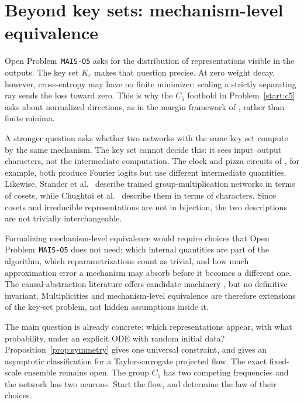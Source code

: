 \documentclass[11pt]{amsart}
\theoremstyle{plain}
\theoremstyle{definition}
\begin{document}
\section{Beyond key sets: mechanism-level equivalence}\label{sec:resist}

Open Problem~\texttt{MAIS-O5} asks for the distribution of representations visible in the outputs. The key set $K_\varepsilon$ makes that question precise. At zero weight decay, however, cross-entropy may have no finite minimizer: scaling a strictly separating ray sends the loss toward zero. This is why the $C_5$ foothold in Problem~\ref{start:c5} asks about normalized directions, as in the margin framework of \cite{wei2019,lyu2020,morwani2024}, rather than finite minima.

A stronger question asks whether two networks with the same key set compute by the same mechanism. The key set cannot decide this: it sees input--output characters, not the intermediate computation. The clock and pizza circuits of \cite{zhong2023}, for example, both produce Fourier logits but use different intermediate quantities. Likewise, Stander et al.~\cite{stander2024} describe trained group-multiplication networks in terms of cosets, while Chughtai et al.~\cite{chughtai2023} describe them in terms of characters. Since cosets and irreducible representations are not in bijection, the two descriptions are not trivially interchangeable.

Formalizing mechanism-level equivalence would require choices that Open Problem~\texttt{MAIS-O5} does not need: which internal quantities are part of the algorithm, which reparametrizations count as trivial, and how much approximation error a mechanism may absorb before it becomes a different one. The causal-abstraction literature offers candidate machinery \cite{geiger2025}, but no definitive invariant. Multiplicities and mechanism-level equivalence are therefore extensions of the key-set problem, not hidden assumptions inside it.

The main question is already concrete: which representations appear, with what probability, under an explicit ODE with random initial data? Proposition~\ref{prop:symmetry} gives one universal constraint, and \cite{he2026spectral} gives an asymptotic classification for a Taylor-surrogate projected flow. The exact fixed-scale ensemble remains open. The group $C_5$ has two competing frequencies and the network has two neurons. Start the flow, and determine the law of their choices.
\end{document}
